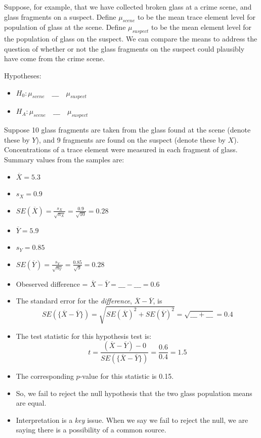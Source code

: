 \documentclass[]{book}
\providecommand{\tightlist}{%
  \setlength{\itemsep}{0pt}\setlength{\parskip}{0pt}}
\theoremstyle{definition}
\theoremstyle{definition}
\theoremstyle{remark}
\begin{document}
Suppose, for example, that we have collected broken glass at a crime
scene, and glass fragments on a suspect. Define \(\mu_{scene}\) to be
the mean trace element level for population of glass at the scene.
Define \(\mu_{suspect}\) to be the mean element level for the population
of glass on the suspect. We can compare the means to address the
question of whether or not the glass fragments on the suspect could
plausibly have come from the crime scene.

Hypotheses:

\begin{itemize}
\tightlist
\item
  \(H_0 : \mu_{scene} \quad \_\_\_ \quad \mu_{suspect}\) \vspace{.1in}
\item
  \(H_A : \mu_{scene} \quad \_\_\_ \quad \mu_{suspect}\)
\end{itemize}

Suppose 10 glass fragments are taken from the glass found at the scene
(denote these by \(Y\)), and 9 fragments are found on the suspect
(denote these by \(X\)). Concentrations of a trace element were measured
in each fragment of glass. Summary values from the samples are:

\begin{itemize}
\tightlist
\item
  \(\overline{X} = 5.3\) \vspace{.1in}
\item
  \(s_X = 0.9\) \vspace{.1in}
\item
  \(SE(\overline{X}) = \frac{s_X}{\sqrt{n_X}} = \frac{0.9}{\sqrt{10}} = 0.28\)
  \vspace{.1in}
\item
  \(\overline{Y} = 5.9\) \vspace{.1in}
\item
  \(s_Y = 0.85\) \vspace{.1in}
\item
  \(SE(\overline{Y}) = \frac{s_Y}{\sqrt{n_Y}} = \frac{0.85}{\sqrt{9}} = 0.28\)
  \vspace{.1in}
\item
  Obeserved difference =
  \(\overline{X} - \overline{Y} = \_\_\_ - \_\_\_ = 0.6\) \vspace{.1in}
\item
  The standard error for the \emph{difference},
  \(\overline{X} - \overline{Y}\), is
  \[SE(\{\overline{X} - \overline{Y}\}) = \sqrt{SE(\overline{X})^2 + SE(\overline{Y})^2} = \sqrt{\_\_\_ + \_\_\_} = 0.4\]
\item
  The test statistic for this hypothesis test is:
  \[t = \frac{(\overline{X} - \overline{Y}) - 0}{SE(\{\overline{X} - \overline{Y}\})} = \frac{0.6}{0.4} = 1.5\]
\item
  The corresponding \(p\)-value for this statistic is 0.15.
\item
  So, we fail to reject the null hypothesis that the two glass
  population means are equal.
\item
  Interpretation is a \emph{key} issue. When we say we fail to reject
  the null, we are saying there is a possibility of a common source.
\end{itemize}
\end{document}
